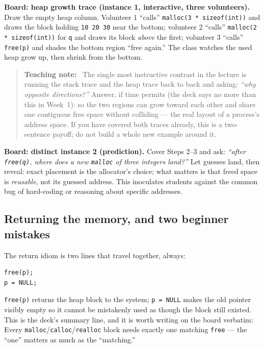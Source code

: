 \documentclass[11pt]{article}
\newenvironment{teachingaside}{\begin{quote}\small\color{primary-gold}\textbf{Teaching note:}\ }{\end{quote}}
\begin{document}
\textbf{Board: heap growth trace (instance 1, interactive, three volunteers).} Draw the empty heap column. Volunteer 1 ``calls'' \texttt{malloc(3 * sizeof(int))} and draws the block holding \texttt{10 20 30} near the bottom; volunteer 2 ``calls'' \texttt{malloc(2 * sizeof(int))} for \texttt{q} and draws its block \emph{above} the first; volunteer 3 ``calls'' \texttt{free(p)} and shades the bottom region ``free again.'' The class watches the used heap grow up, then shrink from the bottom.

\begin{teachingaside}
The single most instructive contrast in the lecture is running the stack trace and the heap trace back to back and asking: \emph{``why opposite directions?''} Answer, if time permits (the deck says no more than this in Week~1): so the two regions can grow toward each other and share one contiguous free space without colliding --- the real layout of a process's address space. If you have covered both traces already, this is a two-sentence payoff; do not build a whole new example around it.
\end{teachingaside}

\textbf{Board: distinct instance 2 (prediction).} Cover Steps 2--3 and ask: \emph{``after \texttt{free(q)}, where does a new \texttt{malloc} of three integers land?''} Let guesses land, then reveal: exact placement is the allocator's choice; what matters is that freed space is \emph{reusable}, not its guessed address. This inoculates students against the common bug of hard-coding or reasoning about specific addresses.

\subsection{Returning the memory, and two beginner mistakes}
\label{sec:heap-return}

The return idiom is two lines that travel together, always:
\begin{verbatim}
free(p);
p = NULL;
\end{verbatim}
\texttt{free(p)} returns the heap block to the system; \texttt{p = NULL} makes the old pointer visibly empty so it cannot be mistakenly used as though the block still existed. This is the deck's summary line, and it is worth writing on the board verbatim:  Every \texttt{malloc}/\texttt{calloc}/\texttt{realloc} block needs exactly one matching \texttt{free} --- the ``one'' matters as much as the ``matching.''
\end{document}
